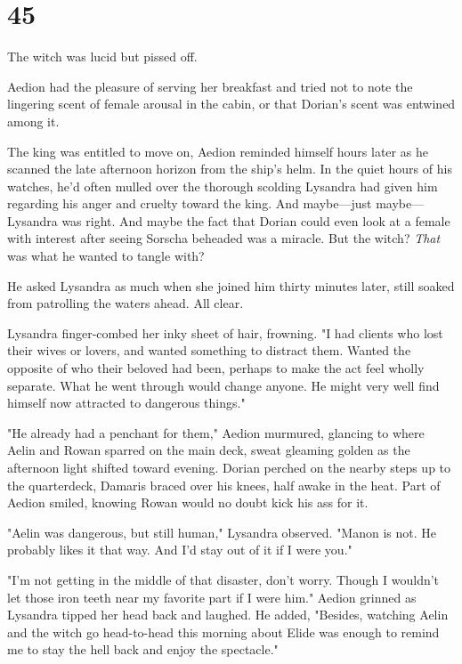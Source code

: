 
\chapter{45}

The witch was lucid but pissed off.

Aedion had the pleasure of serving her breakfast and tried not to note the lingering scent of female arousal in the cabin, or that Dorian's scent was entwined among it.

The king was entitled to move on, Aedion reminded himself hours later as he scanned the late afternoon horizon from the ship's helm. In the quiet hours of his watches, he'd often mulled over the thorough scolding Lysandra had given him regarding his anger and cruelty toward the king. And maybe---just maybe--- Lysandra was right. And maybe the fact that Dorian could even look at a female with interest after seeing Sorscha beheaded was a miracle. But  the witch? \emph{That} was what he wanted to tangle with?

He asked Lysandra as much when she joined him thirty minutes later, still soaked from patrolling the waters ahead. All clear.

Lysandra finger-combed her inky sheet of hair, frowning. "I had clients who lost their wives or lovers, and wanted something to distract them. Wanted the opposite of who their beloved had been, perhaps to make the act feel wholly separate. What he went through would change anyone. He might very well find himself now attracted to dangerous things."

"He already had a penchant for them," Aedion murmured, glancing to where Aelin and Rowan sparred on the main deck, sweat gleaming golden as the afternoon light shifted toward evening. Dorian perched on the nearby steps up to the quarterdeck, Damaris braced over his knees, half awake in the heat. Part of Aedion smiled, knowing Rowan would no doubt kick his ass for it.

"Aelin was dangerous, but still human," Lysandra observed. "Manon is
 not. He probably likes it that way. And I'd stay out of it if I were you."

"I'm not getting in the middle of that disaster, don't worry. Though I wouldn't let those iron teeth near my favorite part if I were him." Aedion grinned as Lysandra tipped her head back and laughed. He added, "Besides, watching Aelin and the witch go head-to-head this morning about Elide was enough to remind me to stay the hell back and enjoy the spectacle."

